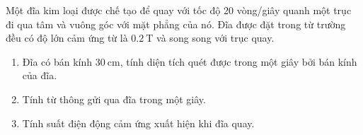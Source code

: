 \begin{vd}
	Một đĩa kim loại được chế tạo để quay với tốc độ 20 vòng/giây quanh một trục đi qua tâm và vuông góc với mặt phẳng của nó. Đĩa được đặt trong từ trường đều có độ lớn cảm ứng từ là $\SI{0.2}{\tesla}$ và song song với trục quay.
	\begin{enumerate}[label=\alph*)]
		\item Đĩa có bán kính $\SI{30}{\centi\meter}$, tính diện tích quét được trong một giây bởi bán kính của đĩa.
		\item Tính từ thông gửi qua đĩa trong một giây.
		\item Tính suất điện động cảm ứng xuất hiện khi đĩa quay.
	\end{enumerate}
\end{vd}

